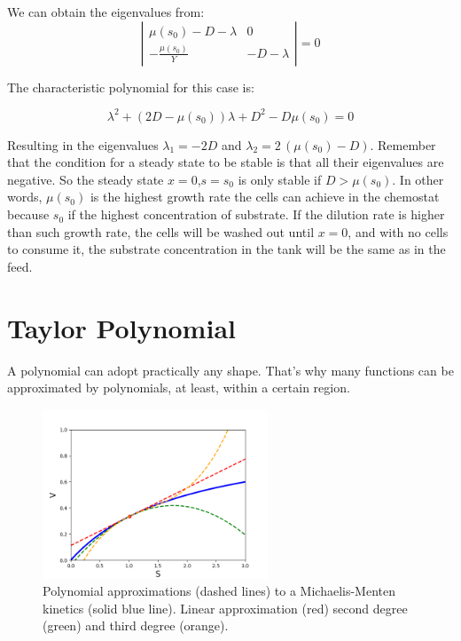 \documentclass{tufte-book} %
\begin{document}
We can obtain the eigenvalues from:
 \begin{equation}
\left| \begin{matrix}  \mu(s_0) - D - \lambda  & 0\\   - \frac{\mu(s_0)
	}{Y}  &  - D- \lambda
\end{matrix} \right| = 0 \nonumber
\end{equation}

The characteristic polynomial for this case is:

 \begin{equation}
	\lambda^2 + \left( 2 D - \mu(s_0)\right) \lambda  +D^2-D \mu(s_0) = 0  \nonumber
\end{equation}

Resulting in the eigenvalues $\lambda_1 = -2 D$ and $\lambda_2 = 2\,(\mu(s_0) - D)$. Remember that the condition for a steady state to be stable is that all their eigenvalues are negative. So the steady state $x=0$,$s=s_0$ is only stable if $D > \mu(s_0)$. In other words, $\mu(s_0)$ is the highest growth rate the cells can achieve in the chemostat because $s_0$ if the highest concentration of substrate. If the dilution rate is higher than such growth rate, the cells will be washed out until $x=0$, and with no cells to consume it, the substrate concentration in the tank will be the same as in the feed.



\clearpage
\appendix
\section{Taylor Polynomial}
A polynomial can adopt practically any shape. That's why many functions can be approximated by polynomials, at least, within a certain region.

\begin{figure}[htb]
	\begin{center}
		\includegraphics[width=0.6\textwidth]{MMapprox}
	\end{center}
	\caption{Polynomial approximations (dashed lines) to a Michaelis-Menten kinetics (solid blue line). Linear approximation (red) second degree (green) and third degree (orange).}
	\label{fig:MMapprox}
\end{figure}
\end{document}
